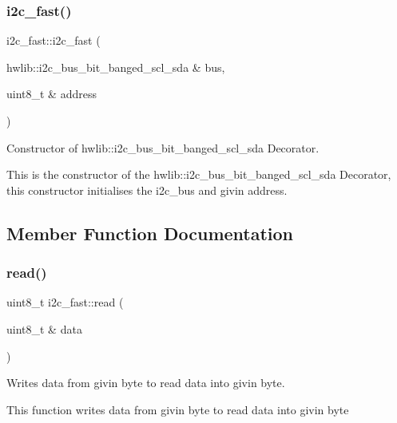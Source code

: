 \subsubsection{\texorpdfstring{i2c\+\_\+fast()}{i2c\_fast()}}
{\footnotesize\ttfamily i2c\+\_\+fast\+::i2c\+\_\+fast (\begin{DoxyParamCaption}\item[{hwlib\+::i2c\+\_\+bus\+\_\+bit\+\_\+banged\+\_\+scl\+\_\+sda \&}]{bus,  }\item[{uint8\+\_\+t \&}]{address }\end{DoxyParamCaption})\hspace{0.3cm}{\ttfamily [inline]}}



Constructor of hwlib\+::i2c\+\_\+bus\+\_\+bit\+\_\+banged\+\_\+scl\+\_\+sda Decorator. 

This is the constructor of the hwlib\+::i2c\+\_\+bus\+\_\+bit\+\_\+banged\+\_\+scl\+\_\+sda Decorator, this constructor initialises the i2c\+\_\+bus and givin address. 

\subsection{Member Function Documentation}
\mbox{\label{classi2c__fast_a90f3dca1f0688fc2ae567c6ee8b6c42e}} 
\subsubsection{\texorpdfstring{read()}{read()}\hspace{0.1cm}{\footnotesize\ttfamily [1/2]}}
{\footnotesize\ttfamily uint8\+\_\+t i2c\+\_\+fast\+::read (\begin{DoxyParamCaption}\item[{uint8\+\_\+t \&}]{data }\end{DoxyParamCaption})\hspace{0.3cm}{\ttfamily [inline]}}



Writes data from givin byte to read data into givin byte. 

This function writes data from givin byte to read data into givin byte \mbox{\label{classi2c__fast_a51ad18b2edee256e274ee8f014369b73}} 
